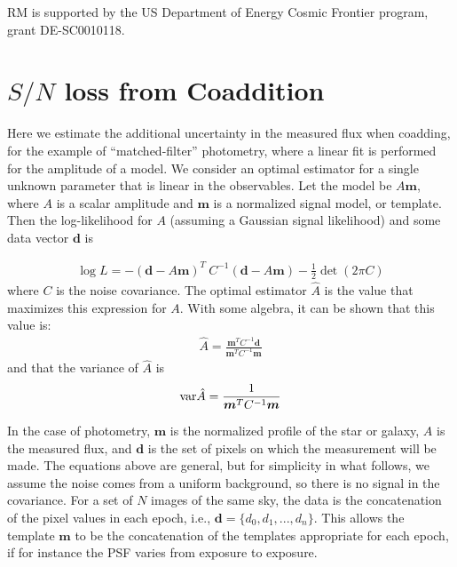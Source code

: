 \documentclass[fleqn,useAMS,usenatbib]{mnras}
\begin{document}
RM is supported by the US Department of Energy Cosmic Frontier program, grant DE-SC0010118.





\appendix
\section{$S/N$ loss from Coaddition} 
\label{Section:FluxSN}
Here we estimate the additional uncertainty in the measured flux when coadding,
for the example of ``matched-filter'' photometry, where a linear fit is 
performed
for the amplitude of a model.
We consider an optimal estimator for a single unknown parameter that is
linear in the observables. Let the model be $A\boldsymbol{m}$, where $A$ is a
scalar amplitude and $\boldsymbol{m}$ is a normalized signal model, or
template. Then the log-likelihood for $A$ (assuming a Gaussian signal
likelihood) and some data vector $\boldsymbol{d}$ is

\begin{align}
\log L = - (\boldsymbol{d} - A\boldsymbol{m})^T\: C^{-1} (\boldsymbol{d} - 
A\boldsymbol{m}) - \frac{1}{2} \det(2\pi C )
\end{align}
where $C$ is the noise covariance.  The optimal estimator $\hat{A}$ is the
value that maximizes this expression for $A$. With some algebra, it can be
shown that this value is:
\begin{align}
\hat{A} = \frac{\boldsymbol{m}^T C^{-1} \boldsymbol{d}}{\boldsymbol{m}^T C^{-1} 
\boldsymbol{m}}
\end{align}
and that the variance of $\hat{A}$ is
\begin{align}
{\rm var}\hat{A} = \frac{1}{{\boldsymbol{m}^T C^{-1} \boldsymbol{m}}}
\end{align}

In the case of photometry, $\boldsymbol{m}$ is the normalized profile of the
star or galaxy, $A$ is the measured flux, and $\boldsymbol{d}$ is the set of
pixels on which the measurement will be made.  The equations above are general,
but for simplicity in what follows, we assume the noise comes from a uniform
background, so there is no signal in the covariance.
For a set of $N$ images of the same sky, the data is the concatenation of the
pixel values in each epoch, i.e., $\boldsymbol{d} = \{d_0, d_1, ..., d_n \}$.
This allows the template $\boldsymbol{m}$ to be the concatenation of the
templates appropriate for each epoch, if for instance the PSF varies from
exposure to exposure.
\end{document}

